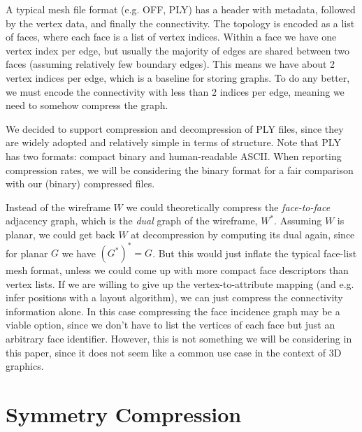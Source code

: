 \documentclass{egpubl}
\begin{document}
A typical mesh file format (e.g. OFF, PLY) has a header with metadata, followed by the vertex data, and finally the connectivity.
The topology is encoded as a list of faces, where each face is a list of vertex indices. Within a face we have one vertex index per edge, but usually the majority of edges are shared between two faces (assuming relatively few boundary edges). This means we have about 2 vertex indices per edge, which is a baseline for storing graphs. To do any better, we must encode the connectivity with less than 2 indices per edge, meaning we need to somehow compress the graph.

We decided to support compression and decompression of PLY files, since they are widely adopted and relatively simple in terms of structure.
Note that PLY has two formats: compact binary and human-readable ASCII. When reporting compression rates, we will be considering the binary format for a fair comparison with our (binary) compressed files.

Instead of the wireframe $W$ we could theoretically compress the \textit{face-to-face} 
adjacency graph, which is the \textit{dual} graph of the wireframe, $W^*$. Assuming $W$ is planar, we could get back $W$ at decompression by computing its dual again, since for planar $G$ we have $(G^*)^* = G$.
But this would just inflate the typical face-list mesh format, unless we could come up with more compact face descriptors than vertex lists.
If we are willing to give up the vertex-to-attribute mapping (and e.g. infer positions with a layout algorithm), we can just compress the connectivity information alone. In this case compressing the face incidence graph may be a viable option, since we don't have to list the vertices of each face but just an arbitrary face identifier.
However, this is not something we will be considering in this paper, since it does not seem like a common use case in the context of 3D graphics.


\section{Symmetry Compression}
\end{document}
